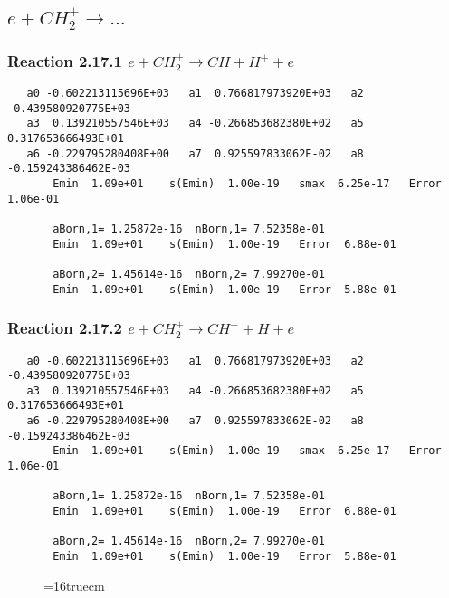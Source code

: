 \documentclass[12pt]{article}
\begin{document}
\subsection{
$e + CH_2^+ \rightarrow ... $
}

\subsubsection{
Reaction 2.17.1   $e + CH_2^+ \rightarrow CH + H^+ + e$
}

\begin{small}\begin{verbatim} 
   a0 -0.602213115696E+03   a1  0.766817973920E+03   a2 -0.439580920775E+03
   a3  0.139210557546E+03   a4 -0.266853682380E+02   a5  0.317653666493E+01
   a6 -0.229795280408E+00   a7  0.925597833062E-02   a8 -0.159243386462E-03
       Emin  1.09e+01    s(Emin)  1.00e-19   smax  6.25e-17   Error  1.06e-01
 
       aBorn,1= 1.25872e-16  nBorn,1= 7.52358e-01
       Emin  1.09e+01    s(Emin)  1.00e-19   Error  6.88e-01
 
       aBorn,2= 1.45614e-16  nBorn,2= 7.99270e-01
       Emin  1.09e+01    s(Emin)  1.00e-19   Error  5.88e-01
\end{verbatim}\end{small}

\subsubsection{
Reaction 2.17.2   $e + CH_2^+ \rightarrow CH^+ + H + e$
}

\begin{small}\begin{verbatim} 
   a0 -0.602213115696E+03   a1  0.766817973920E+03   a2 -0.439580920775E+03
   a3  0.139210557546E+03   a4 -0.266853682380E+02   a5  0.317653666493E+01
   a6 -0.229795280408E+00   a7  0.925597833062E-02   a8 -0.159243386462E-03
       Emin  1.09e+01    s(Emin)  1.00e-19   smax  6.25e-17   Error  1.06e-01
 
       aBorn,1= 1.25872e-16  nBorn,1= 7.52358e-01
       Emin  1.09e+01    s(Emin)  1.00e-19   Error  6.88e-01
 
       aBorn,2= 1.45614e-16  nBorn,2= 7.99270e-01
       Emin  1.09e+01    s(Emin)  1.00e-19   Error  5.88e-01
\end{verbatim}\end{small}

\begin{figure} \label{met.1_2.17}
\epsfxsize=16truecm
\end{figure}
\newpage
\end{document}
